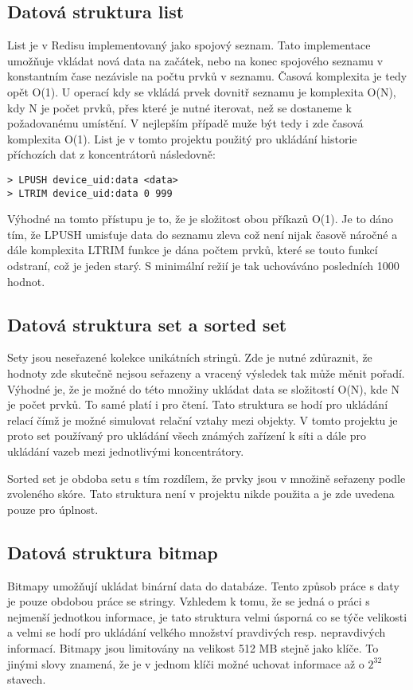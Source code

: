 \subsection{Datová struktura list}
List je v Redisu implementovaný jako spojový seznam. Tato implementace umožňuje vkládat nová data na začátek, nebo na konec spojového seznamu v konstantním čase nezávisle na počtu prvků v seznamu. Časová komplexita je tedy opět O(1). U operací kdy se vkládá prvek dovnitř seznamu je komplexita O(N), kdy N je počet prvků, přes které je nutné iterovat, než se dostaneme k požadovanému umístění. V nejlepším případě muže být tedy i zde časová komplexita O(1). List je v tomto projektu použitý pro ukládání historie příchozích dat z koncentrátorů následovně:

\begin{verbatim}
> LPUSH device_uid:data <data>
> LTRIM device_uid:data 0 999
\end{verbatim}

Výhodné na tomto přístupu je to, že je složitost obou příkazů O(1). Je to dáno tím, že LPUSH umisťuje data do seznamu zleva což není nijak časově náročné a dále komplexita LTRIM funkce je dána počtem prvků, které se touto funkcí odstraní, což je jeden starý. S minimální režií je tak uchováváno posledních 1000 hodnot.

\subsection{Datová struktura set a sorted set}
Sety jsou neseřazené kolekce unikátních stringů. Zde je nutné zdůraznit, že hodnoty zde skutečně nejsou seřazeny a vracený výsledek tak může měnit pořadí. Výhodné je, že je možné do této množiny ukládat data se složitostí O(N), kde N je počet prvků. To samé platí i pro čtení. Tato struktura se hodí pro ukládání relací čímž je možné simulovat relační vztahy mezi objekty. V tomto projektu je proto set používaný pro ukládání všech známých zařízení k síti a dále pro ukládání vazeb mezi jednotlivými koncentrátory.

Sorted set je obdoba setu s tím rozdílem, že prvky jsou v množině seřazeny podle zvoleného skóre. Tato struktura není v projektu nikde použita a je zde uvedena pouze pro úplnost.

\subsection{Datová struktura bitmap}
Bitmapy umožňují ukládat binární data do databáze. Tento způsob práce s daty je pouze obdobou práce se stringy. Vzhledem k tomu, že se jedná o práci s nejmenší jednotkou informace, je tato struktura velmi úsporná co se týče velikosti a velmi se hodí pro ukládání velkého množství pravdivých resp. nepravdivých informací. Bitmapy jsou limitovány na velikost 512 MB stejně jako klíče. To jinými slovy znamená, že je v jednom klíči možné uchovat informace až o $2^{32}$ stavech.

